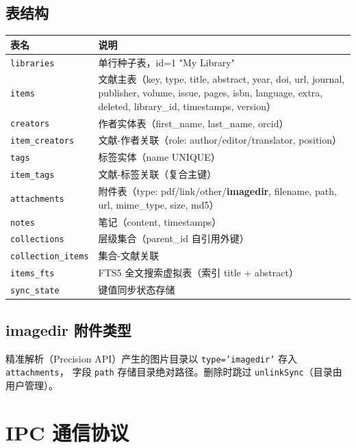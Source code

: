 \documentclass[12pt, a4paper]{article}
\begin{document}
\subsection{表结构}

\begin{longtable}{p{3.2cm} p{9cm}}
  \toprule
  \textbf{表名} & \textbf{说明} \\
  \midrule
  \texttt{libraries}      & 单行种子表，id=1 "My Library" \\
  \texttt{items}          & 文献主表（key, type, title, abstract, year, doi, url, journal, publisher, volume, issue, pages, isbn, language, extra, deleted, library\_id, timestamps, version） \\
  \texttt{creators}       & 作者实体表（first\_name, last\_name, orcid） \\
  \texttt{item\_creators} & 文献-作者关联（role: author/editor/translator, position） \\
  \texttt{tags}           & 标签实体（name UNIQUE） \\
  \texttt{item\_tags}     & 文献-标签关联（复合主键） \\
  \texttt{attachments}    & 附件表（type: pdf/link/other/\textbf{imagedir}, filename, path, url, mime\_type, size, md5） \\
  \texttt{notes}          & 笔记（content, timestamps） \\
  \texttt{collections}    & 层级集合（parent\_id 自引用外键） \\
  \texttt{collection\_items} & 集合-文献关联 \\
  \texttt{items\_fts}     & FTS5 全文搜索虚拟表（索引 title + abstract） \\
  \texttt{sync\_state}    & 键值同步状态存储 \\
  \bottomrule
\end{longtable}

\subsection{imagedir 附件类型}

精准解析（Precision API）产生的图片目录以 \texttt{type='imagedir'} 存入 \texttt{attachments}，
字段 \texttt{path} 存储目录绝对路径。删除时跳过 \texttt{unlinkSync}（目录由用户管理）。

\section{IPC 通信协议}
\label{sec:ipc}
\end{document}
